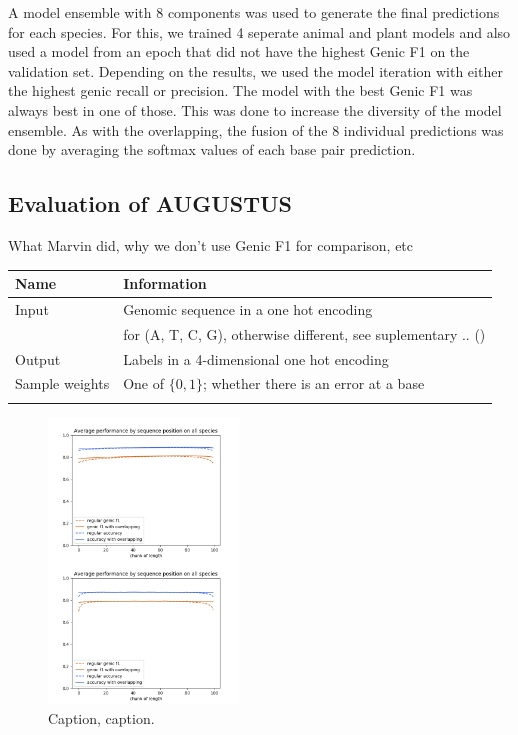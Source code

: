 \documentclass{bioinfo}
\begin{document}
\begin{methods}
A model ensemble with 8 components was used to generate the final predictions for each species. For this, we trained 4 seperate animal and plant models and also used a model from an epoch that did not have the highest Genic F1 on the validation set. Depending on the results, we used the model iteration with either the highest genic recall or precision. The model with the best Genic F1 was always best in one of those. This was done to increase the diversity of the model ensemble. As with the overlapping, the fusion of the 8 individual predictions was done by averaging the softmax values of each base pair prediction.

\subsection{Evaluation of AUGUSTUS} \label{sec:augustus}
What Marvin did, why we don't use Genic F1 for comparison, etc


\begin{table}[!t]
 {
\begin{tabular}{@{}ll@{}}
\toprule Name & Information \\
\midrule
Input & Genomic sequence in a one hot encoding\\
	  & for (A, T, C, G), otherwise different, see suplementary .. ()\\
Output & Labels in a 4-dimensional one hot encoding \\
Sample weights & One of $\{0,1\}$; whether there is an error at a base\\
\botrule
\end{tabular}}{}
\end{table}

\end{methods}

\begin{figure}[!tpb]
\centerline{\includegraphics[width=0.45\textwidth]{images/overlapping/both_species_overlapping_aggregate_comparison}}
\caption{Caption, caption.}\label{fig:length_wise_bias}
\end{figure}
\end{document}
